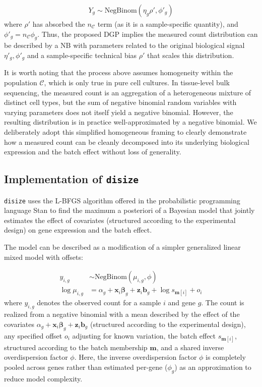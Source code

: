 \documentclass[10pt,letterpaper]{article}
\begin{document}
\begin{align}
    Y_g \sim \text{NegBinom}(\eta_g \rho', \phi'_g)
\end{align}
where $\rho'$ has absorbed the $n_{\mathcal{C}}$ term (as it is a sample-specific quantity), and $\phi'_g = n_{\mathcal{C}} \phi_g$.
Thus, the proposed DGP implies the measured count distribution can be described by a NB with parameters related to the original biological signal $\eta'_g, \phi'_g$ and a sample-specific technical bias $\rho'$ that scales this distribution.

It is worth noting that the process above assumes homogeneity within the population $\mathcal{C}$, which is only true in pure cell cultures. 
In tissue-level bulk sequencing, the measured count is an aggregation of a heterogeneous mixture of distinct cell types, but the sum of negative binomial random variables with varying parameters does not itself yield a negative binomial. 
However, the resulting distribution is in practice well-approximated by a negative binomial.
We deliberately adopt this simplified homogeneous framing to clearly demonstrate how a measured count can be cleanly decomposed into its underlying biological expression and the batch effect without loss of generality.

\subsection*{Implementation of \texttt{disize}}

\texttt{disize} uses the L-BFGS algorithm offered in the probabilistic programming language Stan to find the maximum a posteriori of a Bayesian model that jointly estimates the effect of covariates (structured according to the experimental design) on gene expression and the batch effect.

The model can be described as a modification of a simpler generalized linear mixed model with offsets:

\begin{subequations}
    \begin{align}
        y_{i,g} &\sim \text{NegBinom}(\mu_{i,g}, \phi) \\
        \log \mu_{i,g} &= \alpha_g + \boldsymbol{x}_i \boldsymbol{\beta}_g + \boldsymbol{z}_i \boldsymbol{b}_g + \log s_{\boldsymbol{m}[i]} + o_i
    \end{align}
\end{subequations}
where $y_{i,g}$ denotes the observed count for a sample $i$ and gene $g$. 
The count is realized from a negative binomial with a mean described by the effect of the covariates $\alpha_g + \boldsymbol{x}_i \boldsymbol{\beta}_g + \boldsymbol{z}_i \boldsymbol{b}_g$ (structured according to the experimental design), any specified offset $o_i$ adjusting for known variation, the batch effect $s_{\boldsymbol{m}[i]}$, structured according to the batch membership $\boldsymbol{m}$, and a shared inverse overdispersion factor $\phi$. Here, the inverse overdispersion factor $\phi$ is completely pooled across genes rather than estimated per-gene ($\phi_g$) as an approximation to reduce model complexity.
\end{document}
